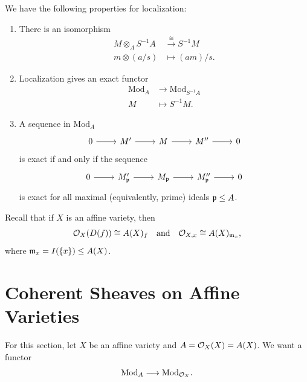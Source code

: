 \begin{prop}\label{prop:localization-properties}
  We have the following properties
  for localization:
  \begin{enumerate}
    \item There is an isomorphism
      \begin{align*}
        M \otimes_A S^{-1} A
        &\overset{\cong}{\longrightarrow} S^{-1} M \\
        m \otimes (a / s)
        &\longmapsto (am) / s.
      \end{align*}
    \item Localization gives an
      exact functor
      \begin{align*}
        \mathrm{Mod}_A
        &\longrightarrow \mathrm{Mod}_{S^{-1} A} \\
        M &\longmapsto S^{-1} M.
      \end{align*}
    \item A sequence in
      $\mathrm{Mod}_A$
      \[
        \begin{tikzcd}
          0 \ar[r] & M' \ar[r] & M \ar[r] & M'' \ar[r] & 0
        \end{tikzcd}
      \]
      is exact if and only if the
      sequence
      \[
        \begin{tikzcd}
          0 \ar[r] & M'_\p \ar[r] & M_\p \ar[r] & M''_\p \ar[r] & 0
        \end{tikzcd}
      \]
      is exact for all
      maximal (equivalently, prime)
      ideals $\mathfrak{p} \le A$.
  \end{enumerate}
\end{prop}

\begin{example}
  Recall that if $X$ is an affine
  variety, then
  \[
    \mathcal{O}_X(D(f)) \cong A(X)_f
    \quad \text{and} \quad
    \mathcal{O}_{X, x} \cong A(X)_{\mathfrak{m}_x},
  \]
  where $\mathfrak{m}_x = I(\{x\}) \le A(X)$.
\end{example}

\section{Coherent Sheaves on Affine Varieties}

\begin{remark}
  For this section, let
  $X$ be an affine variety and
  $A = \mathcal{O}_X(X) = A(X)$. We want a
  functor
  \[
    \mathrm{Mod}_A
    \longrightarrow \mathrm{Mod}_{\mathcal{O}_X}.
  \]
\end{remark}

